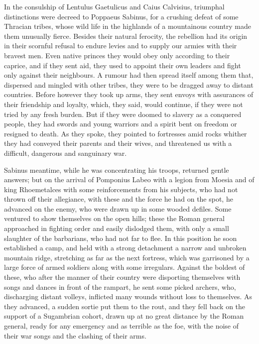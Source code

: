 
In the consulship of Lentulus Gaetulicus and Caius Calvisius, triumphal distinctions were decreed to Poppaeus Sabinus, for a crushing defeat of some Thracian tribes, whose wild life in the highlands of a mountainous country made them unusually fierce. Besides their natural ferocity, the rebellion had its origin in their scornful refusal to endure levies and to supply our armies with their bravest men. Even native princes they would obey only according to their caprice, and if they sent aid, they used to appoint their own leaders and fight only against their neighbours. A rumour had then spread itself among them that, dispersed and mingled with other tribes, they were to be dragged away to distant countries. Before however they took up arms, they sent envoys with assurances of their friendship and loyalty, which, they said, would continue, if they were not tried by any fresh burden. But if they were doomed to slavery as a conquered people, they had swords and young warriors and a spirit bent on freedom or resigned to death. As they spoke, they pointed to fortresses amid rocks whither they had conveyed their parents and their wives, and threatened us with a difficult, dangerous and sanguinary war.


Sabinus meantime, while he was concentrating his troops, returned gentle answers; but on the arrival of Pomponius Labeo with a legion from Moesia and of king Rhoemetalces with some reinforcements from his subjects, who had not thrown off their allegiance, with these and the force he had on the spot, he advanced on the enemy, who were drawn up in some wooded defiles. Some ventured to show themselves on the open hills; these the Roman general approached in fighting order and easily dislodged them, with only a small slaughter of the barbarians, who had not far to flee. In this position he soon established a camp, and held with a strong detachment a narrow and unbroken mountain ridge, stretching as far as the next fortress, which was garrisoned by a large force of armed soldiers along with some irregulars. Against the boldest of these, who after the manner of their country were disporting themselves with songs and dances in front of the rampart, he sent some picked archers, who, discharging distant volleys, inflicted many wounds without loss to themselves. As they advanced, a sudden sortie put them to the rout, and they fell back on the support of a Sugambrian cohort, drawn up at no great distance by the Roman general, ready for any emergency and as terrible as the foe, with the noise of their war songs and the clashing of their arms.

